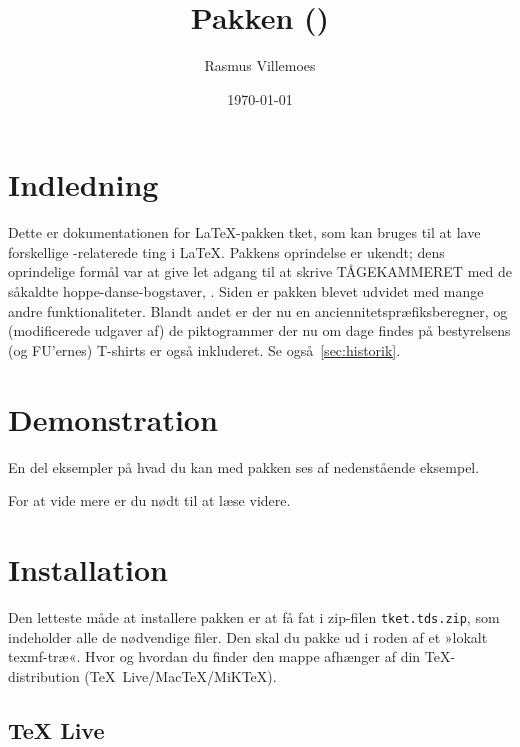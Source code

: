 \documentclass[a4paper,article,oneside]{memoir}
\title{Pakken \ptket (\pTKETVer)}
\author{Rasmus Villemoes}
\date{\today}
\newcommand{\pakkenavn}[1]{\textsf{#1}}
\newcommand{\ptket}{\pakkenavn{tket}\xspace}
\newcommand{\filnavn}[1]{\texttt{#1}}
\newenvironment{resultat}{%
  \begin{adjustwidth}{15mm}{15mm}%
    \begin{qshade}%
    }{%
    \end{qshade}%
  \end{adjustwidth}}
\begin{document}
\maketitle

\tableofcontents*

\section{Indledning}
\label{cha:indledning}

Dette er dokumentationen for \LaTeX-pakken \ptket, som kan bruges til
at lave forskellige \TK-relaterede ting i \LaTeX. Pakkens oprindelse
er ukendt; dens oprindelige formål var at give let adgang til at
skrive \hbox{TÅGEKAMMERET} med de såkaldte hoppe-danse-bogstaver,
\TKET. Siden er pakken blevet udvidet med mange andre
funktionaliteter. Blandt andet er der nu en
anciennitetspræfiksberegner, og (modificerede udgaver af) de
piktogrammer der nu om dage findes på bestyrelsens (og FU'ernes)
T-shirts er også inkluderet. Se også~\autoref{sec:historik}.

\section{Demonstration}
\label{cha:demonstration}

En del eksempler på hvad du kan med pakken ses af nedenstående
eksempel.


\begin{resultat}

\end{resultat}

For at vide mere er du nødt til at læse videre.

\section{Installation}
\label{cha:installation}

Den letteste måde at installere pakken er at få fat i zip-filen
\filnavn{tket.tds.zip}, som indeholder alle de nødvendige filer. Den
skal du pakke ud i roden af et »lokalt texmf-træ«. Hvor og hvordan du
finder den mappe afhænger af din \TeX-distribution (\mbox{\TeX{}
  Live}/\mbox{Mac\TeX}/\mbox{MiK\TeX}).

\subsection{\TeX{} Live}
\label{sec:tex-live}
\end{document}
